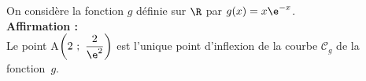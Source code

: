 On considère la fonction $g$ définie sur $\R$ par $g(x) = x\e^{-x}$.\\
\textbf{Affirmation  :}\\	
Le point A$\left(2~;~\dfrac{2}{\e^2}\right)$ est l'unique point d'inflexion de la courbe $\mathcal{C}_g$ de la fonction~$g$.